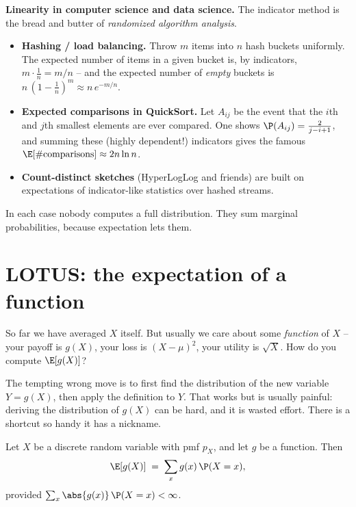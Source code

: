 \begin{applicationbox}
\textbf{Linearity in computer science and data science.} The indicator method is
the bread and butter of \emph{randomized algorithm analysis}.
\begin{itemize}
  \item \textbf{Hashing / load balancing.} Throw $m$ items into $n$ hash buckets
  uniformly. The expected number of items in a given bucket is, by indicators,
  $m\cdot \tfrac1n = m/n$ -- and the expected number of \emph{empty} buckets is
  $n\,(1-\tfrac1n)^m \approx n\,e^{-m/n}$.
  \item \textbf{Expected comparisons in QuickSort.} Let $A_{ij}$ be the event
  that the $i$th and $j$th smallest elements are ever compared. One shows
  $\P(A_{ij}) = \tfrac{2}{j-i+1}$, and summing these (highly dependent!)
  indicators gives the famous $\E[\#\text{comparisons}] \approx 2n\ln n$.
  \item \textbf{Count-distinct sketches} (HyperLogLog and friends) are built on
  expectations of indicator-like statistics over hashed streams.
\end{itemize}
In each case nobody computes a full distribution. They sum marginal
probabilities, because expectation lets them.
\end{applicationbox}

\section{LOTUS: the expectation of a function}
\label{ch08:lotus}

So far we have averaged $X$ itself. But usually we care about some
\emph{function} of $X$ -- your payoff is $g(X)$, your loss is $(X-\mu)^2$, your
utility is $\sqrt{X}$. How do you compute $\E[g(X)]$?

The tempting wrong move is to first find the distribution of the new variable
$Y = g(X)$, then apply the definition to $Y$. That works but is usually painful:
deriving the distribution of $g(X)$ can be hard, and it is wasted effort. There
is a shortcut so handy it has a nickname.

\begin{theorem}
\label{ch08:thm-lotus}
Let $X$ be a discrete random variable with pmf $p_X$, and let $g$ be a function.
Then
\[
  \E[g(X)] \;=\; \sum_{x} g(x)\,\P(X = x),
\]
provided $\sum_x \abs{g(x)}\,\P(X=x) < \infty$.
\end{theorem}

